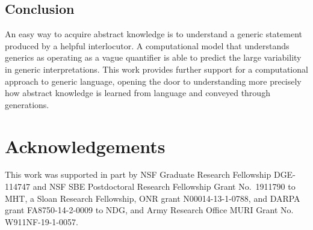 \documentclass[floatsintext,doc]{apa6}
\begin{document}
\hypertarget{conclusion}{%
\subsection{Conclusion}\label{conclusion}}

An easy way to acquire abstract knowledge is to understand a generic statement produced by a helpful interlocutor. 
A computational model that understands generics as operating as a vague quantifier is able to predict the large variability in generic interpretations.
This work provides further support for a computational approach to generic language, opening the door to understanding more precisely how abstract knowledge is learned from language and conveyed through generations.




\section{Acknowledgements}

This work was supported in part by NSF Graduate Research Fellowship DGE-114747 and NSF SBE Postdoctoral Research Fellowship Grant No.~1911790 to MHT, a Sloan Research Fellowship, ONR grant N00014-13-1-0788, and DARPA grant FA8750-14-2-0009 to NDG, and Army Research Office MURI Grant No. W911NF-19-1-0057.


\newpage



\end{document}
